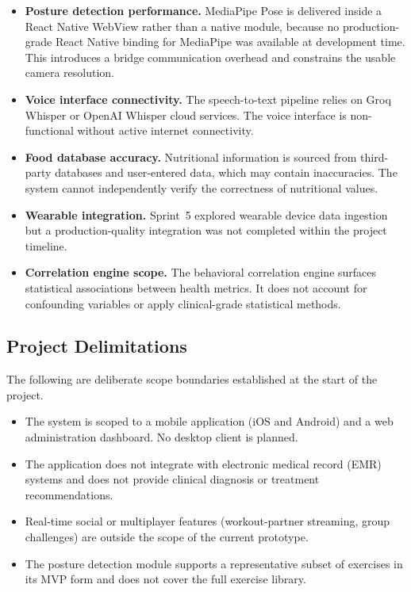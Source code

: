 \begin{itemize}
	\item \textbf{Posture detection performance.} MediaPipe Pose is
	delivered inside a React Native WebView rather than a native module,
	because no production-grade React Native binding for MediaPipe was
	available at development time. This introduces a bridge communication
	overhead and constrains the usable camera resolution.
	
	\item \textbf{Voice interface connectivity.} The speech-to-text
	pipeline relies on Groq Whisper or OpenAI Whisper cloud services.
	The voice interface is non-functional without active internet
	connectivity.
	
	\item \textbf{Food database accuracy.} Nutritional information is
	sourced from third-party databases and user-entered data, which may
	contain inaccuracies. The system cannot independently verify the
	correctness of nutritional values.
	
	\item \textbf{Wearable integration.} Sprint~5 explored wearable
	device data ingestion but a production-quality integration was not
	completed within the project timeline.
	
	\item \textbf{Correlation engine scope.} The behavioral correlation
	engine surfaces statistical associations between health metrics. It
	does not account for confounding variables or apply clinical-grade
	statistical methods.
\end{itemize}

\subsection{Project Delimitations}

The following are deliberate scope boundaries established at the start of
the project.

\begin{itemize}
	\item The system is scoped to a mobile application (iOS and Android)
	and a web administration dashboard. No desktop client is planned.
	
	\item The application does not integrate with electronic medical record
	(EMR) systems and does not provide clinical diagnosis or treatment
	recommendations.
	
	\item Real-time social or multiplayer features (workout-partner
	streaming, group challenges) are outside the scope of the current
	prototype.
	
	\item The posture detection module supports a representative subset of
	exercises in its MVP form and does not cover the full exercise library.
\end{itemize}

